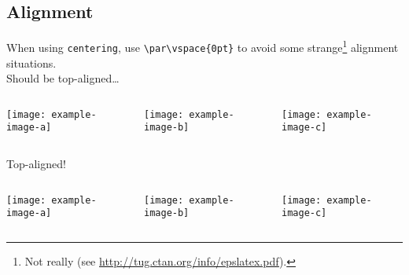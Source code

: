\documentclass[9pt,english]{Beamer_PROMES}\uselanguage{English}\languagepath{English}
\begin{document}
\subsection{Alignment}
\begin{frame}[fragile]%

When using \verb=centering=, use \verb=\par\vspace{0pt}= to avoid some strange\footnote{Not really (see \url{http://tug.ctan.org/info/epslatex.pdf}).} alignment situations.\\[3mm]

Should be top-aligned\dots

\vspace{3mm}
\begin{columns}[t]
   \centering
   \begin{column}{0.1\textwidth}
      \centering
      \texttt{[image: example-image-a]}
   \end{column}
   \begin{column}{0.2\textwidth}
      \centering
      \texttt{[image: example-image-b]}
   \end{column}
   \begin{column}{0.1\textwidth}
      \centering
      \texttt{[image: example-image-c]}
   \end{column}
\end{columns}
\vspace{3mm}

Top-aligned!

\vspace{3mm}
\begin{columns}[t]
   \centering
   \begin{column}{0.1\textwidth}
      \centering
      \par\vspace{0pt}
      \texttt{[image: example-image-a]}
   \end{column}
   \begin{column}{0.2\textwidth}
      \centering
      \par\vspace{0pt}
      \texttt{[image: example-image-b]}
   \end{column}
   \begin{column}{0.1\textwidth}
      \centering
      \par\vspace{0pt}
      \texttt{[image: example-image-c]}
   \end{column}
\end{columns}

\end{frame}
\end{document}
